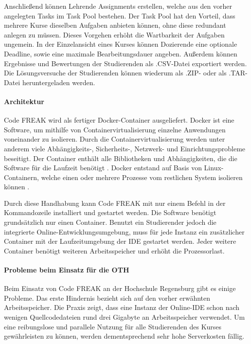 Anschließend können Lehrende Assignments erstellen, welche aus den vorher
angelegten Tasks im Task Pool bestehen. Der Task Pool hat den Vorteil, dass
mehrere Kurse dieselben Aufgaben anbieten können, ohne diese redundant anlegen
zu müssen. Dieses Vorgehen erhöht die Wartbarkeit der Aufgaben ungemein. In der
Einzelansicht eines Kurses können Dozierende eine optionale Deadline, sowie eine
maximale Bearbeitungsdauer angeben. Außerdem können Ergebnisse und Bewertungen
der Studierenden als .CSV-Datei exportiert werden. Die Lösungsversuche der
Studierenden können wiederum als .ZIP- oder als .TAR-Datei heruntergeladen
werden.

\paragraph{Architektur}
Code FREAK wird als fertiger Docker-Container ausgeliefert. Docker ist eine
Software, um mithilfe von Containervirtualisierung einzelne Anwendungen
voneinander zu isolieren. Durch die Containervirtualisierung werden unter
anderem viele Abhängigkeits-, Sicherheits-, Netzwerk- und Einrichtungsprobleme
beseitigt. Der Container enthält alle Bibliotheken und Abhängigkeiten, die die
Software für die Laufzeit benötigt \parencite{docker}. Docker entstand auf Basis
von Linux-Containern, welche einen oder mehrere Prozesse vom restlichen System
isolieren können 
\parencite{linux-container}.

Durch diese Handhabung kann Code FREAK mit nur einem Befehl in der
Kommandozeile installiert und gestartet werden. Die Software benötigt
grundsätzlich nur einen Container. Benutzt ein Studierender jedoch die
integrierte Online-Entwicklungsumgebung, muss für jede Instanz ein zusätzlicher
Container mit der Laufzeitumgebung der IDE gestartet werden. Jeder weitere
Container benötigt weiteren Arbeitsspeicher und erhöht die Prozessorlast.

\paragraph{Probleme beim Einsatz für die OTH}
Beim Einsatz von Code FREAK an der Hochschule Regensburg gibt es einige
Probleme. Das erste Hindernis bezieht sich auf den vorher erwähnten
Arbeitsspeicher. Die Praxis zeigt, dass eine Instanz der Online-IDE schon nach
wenigen Quellcodedateien rund drei Gigabyte an Arbeitsspeicher verwendet. Um
eine reibungslose und parallele Nutzung für alle Studierenden des Kurses
gewährleisten zu können, werden dementsprechend sehr hohe Serverkosten fällig. 
\parencite{codefreak-memory-problem}

